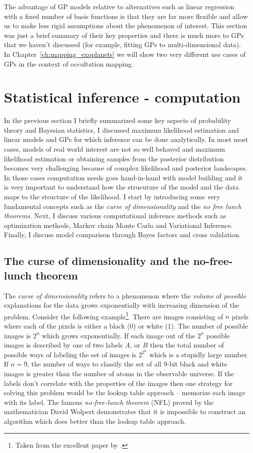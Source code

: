 \documentclass[12pt,dvipsnames]{report}
\begin{document}
The advantage of GP models relative to alternatives such as linear regression
with a fixed number of basis functions is that they are far more flexible and
allow us to make less rigid assumptions about the phenomenon of interest. This
section was just a brief summary of their key properties and there is much more
to GPs that we haven't discussed (for example, fitting GPs to multi-dimensional
data). In Chapter~\ref{ch:mapping_exoplanets} we will show two very different
use cases of GPs in the context of occultation mapping.

\section{Statistical inference - computation}
\label{sec:inference_practice}
In the previous section I briefly summarized some key aspects of probability theory
and Bayesian statistics, I discussed maximum likelihood estimation and
linear models and GPs for which inference can be done analytically.
In most most cases, models of real world interest are not so well behaved and maximum
likelihood estimation or obtaining samples from the posterior
distribution becomes very challenging because of complex likelihood and posterior
landscapes. In those cases computation needs goes hand-in-hand with model building and it
is very important to understand how the strucuture of the model and the data maps to the
structure of the likelihood.
I start by introducing some very fundamental
concepts such as the \emph{curse of dimensionality} and the \emph{no free lunch theorems}.
Next, I discuss various computational inference methods such
as optimization methods, Markov chain Monte Carlo and Variational Inference.
Finally, I discuss model comparison through Bayes factors and cross validation.

\subsection{The curse of dimensionality and the no-free-lunch theorem}
The \emph{curse of dimensionality} refers to a phenomenon where the
\emph{volume} of \emph{possible} explanations for the data grows exponentially
with increasing dimension of the problem. Consider the following
example\footnote{ Taken from the excellent paper by \citet{arXiv:2104.00008}.
}. There are images consisting of $n$ pixels where each of the pixels is either
a black (0) or white (1). The number of possible images is $2^n$ which grows
exponentially. If each image out of the $2^n$ possible images is described by
one of two labels $A$, or $B$ then the total number of possible ways of
labeling the set of images is $2^{2^n}$ which is a stupidly large number. If
$n=9$, the number of ways to classify the set of all 9-bit black and white
images is greater than the number of atoms in the observable universe. If the
labels don't correlate with the properties of the images then one strategy for
solving this problem would be the lookup table approach -- memorize each image
with its label. The famous \emph{no-free-lunch theorem} (NFL) proved by the
mathematician David Wolpert \citep{wolpert1996} demonstrates that it is
impossible to construct an algorithm which does better than the lookup table
approach.
\end{document}
